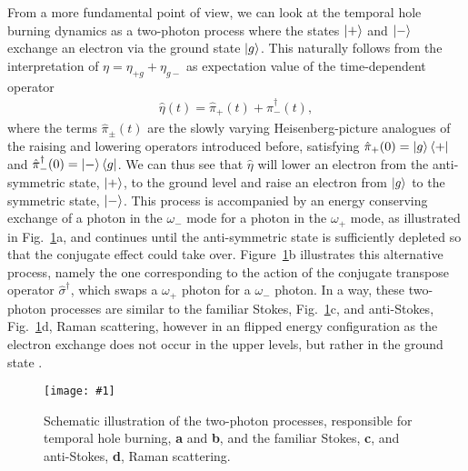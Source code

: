 \documentclass[reprint,secnumarabic,amssymb, nobibnotes, aip, prd]{revtex4-1}
\def\P{\hat{\pi}_+}
\def\M{\hat{\pi}_-}
\newcommand{\includegraphicsXL}[1]{\texttt{[image: \#1]}}
\begin{document}
From a more fundamental point of view, we can look at the temporal hole burning dynamics as a two-photon process where the states $\ket{+}$ and $\ket{-}$ exchange an electron via the ground state $\ket{g}$. This naturally follows from the interpretation of $\eta = \eta_{+g}+\eta_{g-}$ as expectation value of the time-dependent operator \cite{loudon2000quantum}
\begin{align}
\hat\eta(t) = \P(t) +\M^{\dagger}(t),
\end{align}
where the terms $\hat\pi_{\pm}(t)$ are the slowly varying Heisenberg-picture analogues of the raising and lowering operators introduced before, satisfying $\P(0) =\ket{g}\bra{+}$ and $\M^{\dagger}(0)=\ket{-}\bra{g}$. We can thus see that $\hat\eta$ will lower an electron from the anti-symmetric state, $\ket{+}$, to the ground level and raise an electron from $\ket{g}$ to the symmetric state, $\ket{-}$. This process is accompanied by an energy conserving exchange of a photon in the $\omega_{-}$ mode for a photon in the $\omega_{+}$ mode, as illustrated in Fig.~\ref{fig:two_photon_process}a, and continues until the anti-symmetric state is sufficiently depleted so that the conjugate effect could take over. Figure~\ref{fig:two_photon_process}b illustrates this alternative process, namely the one corresponding to the action of the conjugate transpose operator $\hat{\sigma}^{\dagger}$, which swaps a $\omega_+$ photon for a $\omega_-$ photon. In a way, these two-photon processes are similar to the familiar Stokes, Fig.~\ref{fig:two_photon_process}c, and anti-Stokes, Fig.~\ref{fig:two_photon_process}d, Raman scattering, however in an flipped energy configuration as the electron exchange does not occur in the upper levels, but rather in the ground state \cite{butcher1991elements}. 
\begin{figure}[h!]
	\begin{center}
		\includegraphicsXL{IMGS/two_photon_process.eps}
		\caption{Schematic illustration of the two-photon processes, responsible for temporal hole burning, \textbf{a} and \textbf{b}, and the familiar Stokes, \textbf{c}, and anti-Stokes, \textbf{d}, Raman scattering.} \label{fig:two_photon_process}
	\end{center}	
\end{figure}
\end{document}
